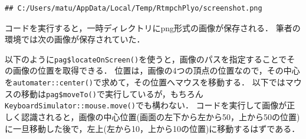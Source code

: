 \documentclass[
]{article}
\newenvironment{Shaded}{\begin{snugshade}}{\end{snugshade}}
\newcommand{\AttributeTok}[1]{\textcolor[rgb]{0.77,0.63,0.00}{#1}}
\newcommand{\CommentTok}[1]{\textcolor[rgb]{0.56,0.35,0.01}{\textit{#1}}}
\newcommand{\DecValTok}[1]{\textcolor[rgb]{0.00,0.00,0.81}{#1}}
\newcommand{\FunctionTok}[1]{\textcolor[rgb]{0.00,0.00,0.00}{#1}}
\newcommand{\NormalTok}[1]{#1}
\newcommand{\OtherTok}[1]{\textcolor[rgb]{0.56,0.35,0.01}{#1}}
\newcommand{\SpecialCharTok}[1]{\textcolor[rgb]{0.00,0.00,0.00}{#1}}
\newcommand{\StringTok}[1]{\textcolor[rgb]{0.31,0.60,0.02}{#1}}
\begin{document}
\begin{Shaded}
\end{Shaded}

\begin{verbatim}
## C:/Users/matu/AppData/Local/Temp/RtmpchPlyo/screenshot.png
\end{verbatim}

コードを実行すると，一時ディレクトリにpng形式の画像が保存される．
筆者の環境では次の画像が保存されていた．

以下のように\texttt{pag\$locateOnScreen()}を使うと，画像のパスを指定することでその画像の位置を取得できる．
位置は，画像の4つの頂点の位置なので，その中心を\texttt{automater::center()}で求めて，その位置へマウスを移動する．
以下ではマウスの移動は\texttt{pag\$moveTo()}で実行しているが，もちろん\texttt{KeyboardSimulator::mouse.move()}でも構わない．
コードを実行して画像が正しく認識されると，画像の中心位置(画面の左下から左から50，上から50の位置)に一旦移動した後で，左上(左から10，上から10の位置)に移動するはずである．

\begin{Shaded}
\end{Shaded}
\end{document}
